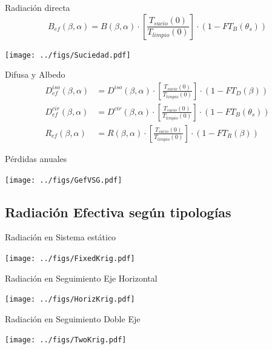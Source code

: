 \documentclass[xcolor={usenames,svgnames,dvipsnames}]{beamer}
\begin{document}
\begin{frame}[label={sec:org83336db}]{Radiación directa}
\[B_{ef}(\beta,\alpha)=B(\beta,\alpha)\cdot\left[\frac{T_{sucio}(0)}{T_{limpio}(0)}\right]\cdot (1-FT_{B}(\theta_{s}))\]
\begin{center}
\texttt{[image: ../figs/Suciedad.pdf]}
\end{center}
\end{frame}

\begin{frame}[label={sec:org6c84679}]{Difusa y Albedo}
\begin{align*}
D_{ef}^{iso}(\beta,\alpha) &= D^{iso}(\beta,\alpha)\cdot\left[\frac{T_{sucio}(0)}{T_{limpio}(0)}\right]\cdot(1-FT_{D}(\beta))\\
D_{ef}^{cir}(\beta,\alpha) &= D^{cir}(\beta,\alpha)\cdot\left[\frac{T_{sucio}(0)}{T_{limpio}(0)}\right]\cdot(1-FT_{B}(\theta_{s}))\\
R_{ef}(\beta,\alpha) &= R(\beta,\alpha)\cdot\left[\frac{T_{sucio}(0)}{T_{limpio}(0)}\right]\cdot(1-FT_{R}(\beta))
\end{align*}
\end{frame}
\begin{frame}[label={sec:org4655317}]{Pérdidas anuales}
\begin{center}
\texttt{[image: ../figs/GefVSG.pdf]}
\end{center}
\end{frame}

\subsection{Radiación Efectiva según tipologías}
\label{sec:org0eb2ad6}

\begin{frame}[label={sec:org2b343bf}]{Radiación en Sistema estático}
\begin{center}
\texttt{[image: ../figs/FixedKrig.pdf]}
\end{center}
\end{frame}



\begin{frame}[label={sec:org712ea28}]{Radiación en Seguimiento Eje Horizontal}
\begin{center}
\texttt{[image: ../figs/HorizKrig.pdf]}
\end{center}
\end{frame}



\begin{frame}[label={sec:org481836d}]{Radiación en Seguimiento Doble Eje}
\begin{center}
\texttt{[image: ../figs/TwoKrig.pdf]}
\end{center}
\end{frame}
\end{document}
